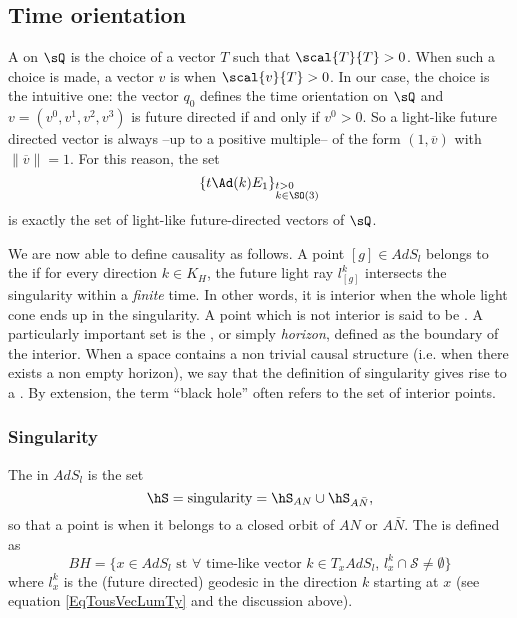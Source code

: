 \subsection{Time orientation}

A  on $\sQ$ is the choice of a vector $T$ such that $\scal{T}{T}>0$. When such a choice is made, a vector $v$ is  when $\scal{v}{T}>0$. In our case, the choice is the intuitive one: the vector $q_0$ defines the time orientation on $\sQ$ and $v=(v^0,v^1,v^2,v^3)$ is future directed if and only if $v^0>0$. So a light-like future directed vector is always --up to a positive multiple-- of the form $(1,\overline{v})$ with $\|\overline{v}\|=1$. For this reason, the set
\begin{equation}	\label{EqTousVecLumTy}
  \{t\Ad(k)E_1\}_{%
\begin{subarray}{l}
t>0\\k\in \SO(3)
\end{subarray}
}
\end{equation}
is exactly the set of light-like future-directed vectors of $\sQ$.

We are now able to define causality as follows.  A point $[g]\in AdS_l$ belongs to the  if for every direction $k\in K_H$, the future light ray $l^k_{[g]}$ intersects the singularity within a \emph{finite} time.  In other words, it is interior when the whole light cone ends up in the singularity.  A point which is not interior is said to be . A particularly important set is the , or simply \emph{horizon}, defined as the boundary of the interior. When a space contains a non trivial causal structure (i.e. when there exists a non empty horizon), we say that the definition of singularity gives rise to a . By extension, the term ``black hole'' often refers to the set of interior points.

\subsubsection{Singularity}

\begin{definition}		\label{Singular}
    The  in $AdS_l$ is the set
    \[
      \hS=\text{singularity}=\hS_{AN}\cup\hS_{A\bar N},
    \]
    so that a point is  when it belongs to a closed orbit of $AN$ or $A\bar N$. The  is defined as
    \[
      BH=\{ x\in AdS_{l} \text{ st } \forall \text{ time-like vector } k\in T_xAdS_l,\,  l^k_x\cap\mathcal{S}\neq\emptyset \}
    \]
    where $l^k_x$ is the (future directed) geodesic in the direction $k$ starting at $x$ (see equation \eqref{EqTousVecLumTy} and the discussion above).
\end{definition}

